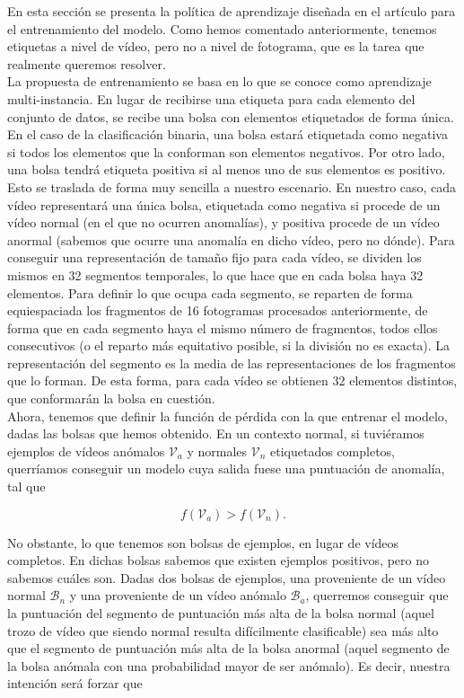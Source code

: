 \documentclass[../main.tex]{memoir}
\begin{document}
En esta sección se presenta la política de aprendizaje diseñada en el
artículo para el entrenamiento del modelo. Como hemos comentado
anteriormente, tenemos etiquetas a nivel de vídeo, pero no a nivel de
fotograma, que es la tarea que realmente queremos resolver.\\

La propuesta de entrenamiento se basa en lo que se conoce como
aprendizaje multi-instancia. En lugar de recibirse una etiqueta para
cada elemento del conjunto de datos, se recibe una bolsa con elementos
etiquetados de forma única. En el caso de la clasificación binaria,
una bolsa estará etiquetada como negativa si todos los elementos que
la conforman son elementos negativos. Por otro lado, una bolsa tendrá
etiqueta positiva si al menos uno de sus elementos es positivo. Esto
se traslada de forma muy sencilla a nuestro escenario. En nuestro
caso, cada vídeo representará una única bolsa, etiquetada como
negativa si procede de un vídeo normal (en el que no ocurren
anomalías), y positiva procede de un vídeo anormal (sabemos que ocurre
una anomalía en dicho vídeo, pero no dónde). Para conseguir una
representación de tamaño fijo para cada vídeo, se dividen los mismos
en 32 segmentos temporales, lo que hace que en cada bolsa haya 32
elementos. Para definir lo que ocupa cada segmento, se reparten de
forma equiespaciada los fragmentos de 16 fotogramas procesados
anteriormente, de forma que en cada segmento haya el mismo número de
fragmentos, todos ellos consecutivos (o el reparto más equitativo
posible, si la división no es exacta). La representación del segmento
es la media de las representaciones de los fragmentos que lo
forman. De esta forma, para cada vídeo se obtienen
32 elementos distintos, que conformarán la bolsa en cuestión.\\

Ahora, tenemos que definir la función de pérdida con la que entrenar
el modelo, dadas las bolsas que hemos obtenido. En un contexto normal,
si tuviéramos ejemplos de vídeos anómalos $\mathcal{V}_a$ y normales
$\mathcal{V}_n$ etiquetados completos, querríamos conseguir un modelo
cuya salida fuese una puntuación de anomalía, tal que

\[ f(\mathcal{V}_a) > f(\mathcal{V}_n). \]

No obstante, lo que tenemos son bolsas de ejemplos, en lugar de vídeos
completos. En dichas bolsas sabemos que existen ejemplos positivos,
pero no sabemos cuáles son. Dadas dos bolsas de ejemplos, una
proveniente de un vídeo normal $\mathcal{B}_n$ y una proveniente de un
vídeo anómalo $\mathcal{B}_a$, querremos conseguir que la puntuación
del segmento de puntuación más alta de la bolsa normal (aquel trozo de
vídeo que siendo normal resulta difícilmente clasificable) sea más
alto que el segmento de puntuación más alta de la bolsa anormal (aquel
segmento de la bolsa anómala con una probabilidad mayor de ser
anómalo). Es decir, nuestra intención será forzar que
\end{document}
